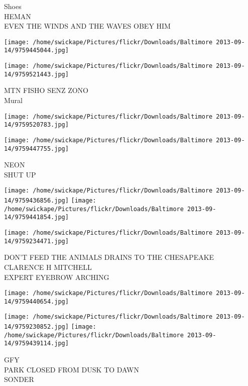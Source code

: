 \documentclass[10pt,letterpaper]{article}
\begin{document}
Shoes\\
HEMAN\\
EVEN THE WINDS AND THE WAVES OBEY HIM\\
\pagebreak

\texttt{[image: /home/swickape/Pictures/flickr/Downloads/Baltimore 2013-09-14/9759445044.jpg]}

\vspace{0.25in}
\texttt{[image: /home/swickape/Pictures/flickr/Downloads/Baltimore 2013-09-14/9759521443.jpg]}

MTN FISHO SENZ ZONO\\
Mural\\
\pagebreak

\texttt{[image: /home/swickape/Pictures/flickr/Downloads/Baltimore 2013-09-14/9759520783.jpg]}

\vspace{0.25in}
\texttt{[image: /home/swickape/Pictures/flickr/Downloads/Baltimore 2013-09-14/9759447755.jpg]}

NEON\\
SHUT UP\\
\pagebreak

\texttt{[image: /home/swickape/Pictures/flickr/Downloads/Baltimore 2013-09-14/9759436856.jpg]}
\texttt{[image: /home/swickape/Pictures/flickr/Downloads/Baltimore 2013-09-14/9759441854.jpg]}

\vspace{0.25in}
\texttt{[image: /home/swickape/Pictures/flickr/Downloads/Baltimore 2013-09-14/9759234471.jpg]}

DON'T FEED THE ANIMALS DRAINS TO THE CHESAPEAKE\\
CLARENCE H MITCHELL\\
EXPERT EYEBROW ARCHING\\
\pagebreak

\texttt{[image: /home/swickape/Pictures/flickr/Downloads/Baltimore 2013-09-14/9759440654.jpg]}

\vspace{0.25in}
\texttt{[image: /home/swickape/Pictures/flickr/Downloads/Baltimore 2013-09-14/9759230852.jpg]}
\texttt{[image: /home/swickape/Pictures/flickr/Downloads/Baltimore 2013-09-14/9759439114.jpg]}

GFY\\
PARK CLOSED FROM DUSK TO DAWN\\
SONDER\\
\pagebreak
\end{document}
